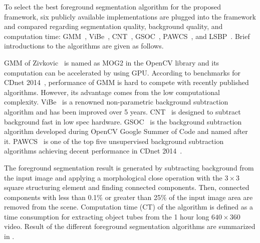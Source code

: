\documentclass[11pt]{hyu_thesis}
\begin{document}
To select the best foreground segmentation algorithm for the proposed framework, six publicly available implementations are plugged into the framework and compared regarding segmentation quality, background quality, and computation time: GMM~\cite{Zivkovic2004}, ViBe~\cite{Barnich2009ViBe,Barnich2011ViBe,VanDroogenbroeck2012Background,VanDroogenbroeck2014ViBe}, CNT~\cite{CNT}, GSOC~\cite{GSOC}, PAWCS~\cite{St-Charles2015}, and LSBP~\cite{Guo2016}. Brief introductions to the algorithms are given as follows. 

GMM of Zivkovic~\cite{Zivkovic2004} is named as MOG2 in the OpenCV library and its computation can be accelerated by using GPU. According to benchmarks for CDnet 2014~\cite{CDnet2014}, performance of GMM is hard to compete with recently published algorithms. However, its advantage comes from the low computational complexity. ViBe~\cite{Barnich2009ViBe,Barnich2011ViBe,VanDroogenbroeck2012Background,VanDroogenbroeck2014ViBe} is a renowned non-parametric background subtraction algorithm and has been improved over 5 years. CNT~\cite{CNT} is designed to subtract background fast in low spec hardware. GSOC~\cite{GSOC} is the background subtraction algorithm developed during OpenCV Google Summer of Code and named after it. PAWCS~\cite{St-Charles2015} is one of the top five unsupervised background subtraction algorithms achieving decent performance in CDnet 2014~\cite{CDnet2014}.

The foreground segmentation result is generated by subtracting background from the input image and applying a morphological close operation with the $3\times3$ square structuring element and finding connected components. Then, connected components with less than 0.1\% or greater than 25\% of the input image area are removed from the scene. Computation time (CT) of the algorithm is defined as a time consumption for extracting object tubes from the 1 hour long $640\times360$ video. Result of the different foreground segmentation algorithms are summarized in . 
\end{document}
